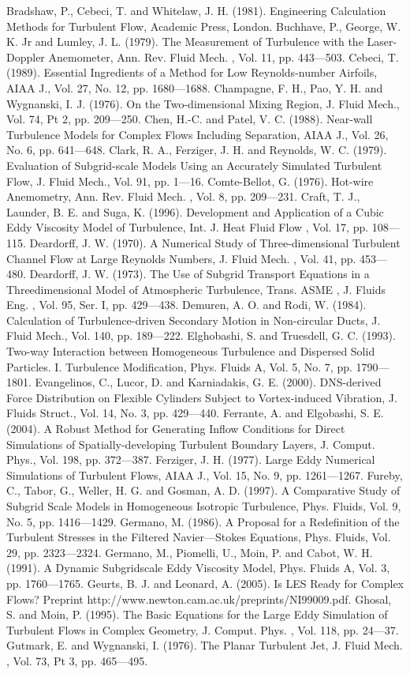 \documentclass[11pt,a4paper,openany,fontset=none]{ctexbook}
\begin{document}
\begin{sloppypar}
{\small Bradshaw, P., Cebeci, T. and Whitelaw, J. H. (1981). Engineering Calculation Methods for Turbulent Flow, Academic Press, London. Buchhave, P., George, W. K. Jr and Lumley, J. L. (1979). The Measurement of Turbulence with the Laser-Doppler Anemometer, Ann. Rev. Fluid Mech. , Vol. 11, pp. 443—503. Cebeci, T. (1989). Essential Ingredients of a Method for Low Reynolds-number Airfoils, AIAA J., Vol. 27, No. 12, pp. 1680—1688. Champagne, F. H., Pao, Y. H. and Wygnanski, I. J. (1976). On the Two-dimensional Mixing Region, J. Fluid Mech., Vol. 74, Pt 2, pp. 209—250. Chen, H.-C. and Patel, V. C. (1988). Near-wall Turbulence Models for Complex Flows Including Separation, AIAA J., Vol. 26, No. 6, pp. 641—648. Clark, R. A., Ferziger, J. H. and Reynolds, W. C. (1979). Evaluation of Subgrid-scale Models Using an Accurately Simulated Turbulent Flow, J. Fluid Mech., Vol. 91, pp. 1—16. Comte-Bellot, G. (1976). Hot-wire Anemometry, Ann. Rev. Fluid Mech. , Vol. 8, pp. 209—231. Craft, T. J., Launder, B. E. and Suga, K. (1996). Development and Application of a Cubic Eddy Viscosity Model of Turbulence, Int. J. Heat Fluid Flow , Vol. 17, pp. 108—115. Deardorff, J. W. (1970). A Numerical Study of Three-dimensional Turbulent Channel Flow at Large Reynolds Numbers, J. Fluid Mech. , Vol. 41, pp. 453— 480. Deardorff, J. W. (1973). The Use of Subgrid Transport Equations in a Threedimensional Model of Atmospheric Turbulence, Trans. ASME , J. Fluids Eng. , Vol. 95, Ser. I, pp. 429—438. Demuren, A. O. and Rodi, W. (1984). Calculation of Turbulence-driven Secondary Motion in Non-circular Ducts, J. Fluid Mech., Vol. 140, pp. 189—222. Elghobashi, S. and Truesdell, G. C. (1993). Two-way Interaction between Homogeneous Turbulence and Dispersed Solid Particles. I. Turbulence Modification, Phys. Fluids A, Vol. 5, No. 7, pp. 1790—1801. Evangelinos, C., Lucor, D. and Karniadakis, G. E. (2000). DNS-derived Force Distribution on Flexible Cylinders Subject to Vortex-induced Vibration, J. Fluids Struct., Vol. 14, No. 3, pp. 429—440. Ferrante, A. and Elgobashi, S. E. (2004). A Robust Method for Generating Inflow Conditions for Direct Simulations of Spatially-developing Turbulent Boundary Layers, J. Comput. Phys., Vol. 198, pp. 372—387. Ferziger, J. H. (1977). Large Eddy Numerical Simulations of Turbulent Flows, AIAA J., Vol. 15, No. 9, pp. 1261—1267. Fureby, C., Tabor, G., Weller, H. G. and Gosman, A. D. (1997). A Comparative Study of Subgrid Scale Models in Homogeneous Isotropic Turbulence, Phys. Fluids, Vol. 9, No. 5, pp. 1416—1429. Germano, M. (1986). A Proposal for a Redefinition of the Turbulent Stresses in the Filtered Navier—Stokes Equations, Phys. Fluids, Vol. 29, pp. 2323—2324. Germano, M., Piomelli, U., Moin, P. and Cabot, W. H. (1991). A Dynamic Subgridscale Eddy Viscosity Model, Phys. Fluids A, Vol. 3, pp. 1760—1765. Geurts, B. J. and Leonard, A. (2005). Is LES Ready for Complex Flows? Preprint http://www.newton.cam.ac.uk/preprints/NI99009.pdf. Ghosal, S. and Moin, P. (1995). The Basic Equations for the Large Eddy Simulation of Turbulent Flows in Complex Geometry, J. Comput. Phys. , Vol. 118, pp. 24—37. Gutmark, E. and Wygnanski, I. (1976). The Planar Turbulent Jet, J. Fluid Mech. , Vol. 73, Pt 3, pp. 465—495.}\par

\end{sloppypar}
\end{document}
